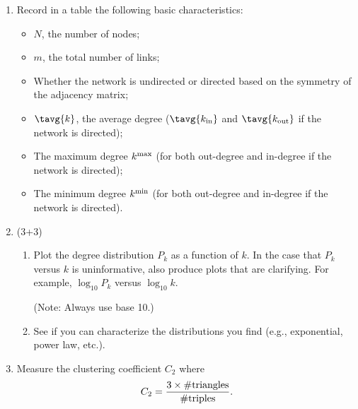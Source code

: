 \begin{enumerate}

\item
  Record in a table the following basic characteristics:
  \begin{itemize}
  \item 
    $N$, the number of nodes;
  \item 
    $m$, the total number of links;
  \item
    Whether the network is undirected or directed based on the symmetry
    of the adjacency matrix;
  \item 
    $\tavg{k}$, the average degree
    ($\tavg{k_{\rm in}}$ 
    and 
    $\tavg{k_{\rm out}}$ 
    if the 
    network is directed);
  \item
    The maximum degree $k^{\rm max}$ (for both out-degree and in-degree if the network is directed);
  \item
    The minimum degree $k^{\rm min}$ (for both out-degree and in-degree if the network is directed).
  \end{itemize}

  
   \solutionstart


   \solutionend


\item (3+3)
  \begin{enumerate}
  \item   
    Plot the degree distribution $P_{k}$
    as a function of $k$.  In the case that $P_{k}$ versus $k$
    is uninformative, also produce plots that are clarifying.
    For example, $\log_{10} P_{k}$ versus $\log_{10} k$.

    (Note: Always use base 10.)

    
   \solutionstart


   \solutionend

  \item   
    See if you can characterize the distributions you find
    (e.g., exponential, power law, etc.).

    
   \solutionstart


   \solutionend

  \end{enumerate}


\item   
  Measure the clustering coefficient $C_{2}$ where
  $$ C_{2} = \frac{3 \times \rm\#triangles}{\rm \#triples}. $$ 


\end{enumerate}
